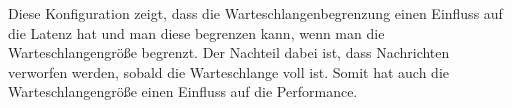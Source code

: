 Diese Konfiguration zeigt, dass die Warteschlangenbegrenzung einen Einfluss auf die Latenz hat und man diese begrenzen kann, wenn man die Warteschlangengröße begrenzt. Der Nachteil dabei ist, dass Nachrichten verworfen werden, sobald die Warteschlange voll ist. Somit hat auch die Warteschlangengröße einen Einfluss auf die Performance. 






